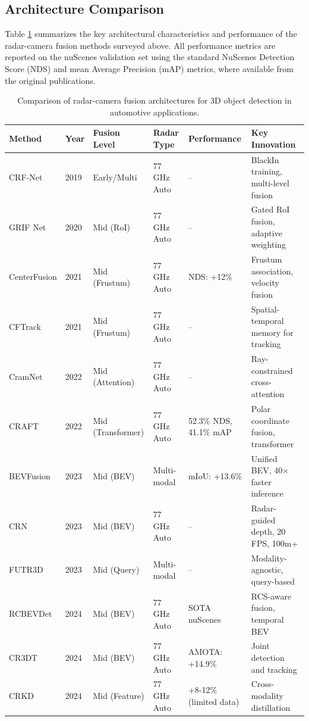 

\subsection{Architecture Comparison}

Table \ref{tab:fusion_architectures} summarizes the key architectural characteristics and performance of the radar-camera fusion methods surveyed above. All performance metrics are reported on the nuScenes validation set using the standard NuScenes Detection Score (NDS) and mean Average Precision (mAP) metrics, where available from the original publications.

\begin{table}[htbp]
\centering
\caption{Comparison of radar-camera fusion architectures for 3D object detection in automotive applications.}
\label{tab:fusion_architectures}
\small
\begin{tabularx}{\textwidth}{@{}lllllX@{}}
\toprule
\textbf{Method} & \textbf{Year} & \textbf{Fusion Level} & \textbf{Radar Type} & \textbf{Performance} & \textbf{Key Innovation} \\
\midrule
CRF-Net \cite{Nobis2019CRFNet} & 2019 & Early/Multi & 77 GHz Auto & -- & BlackIn training, multi-level fusion \\
GRIF Net \cite{Kim2020GRIFNet} & 2020 & Mid (RoI) & 77 GHz Auto & -- & Gated RoI fusion, adaptive weighting \\
CenterFusion \cite{Nabati2021CenterFusion} & 2021 & Mid (Frustum) & 77 GHz Auto & NDS: +12\% & Frustum association, velocity fusion \\
CFTrack \cite{Nabati2021CFTrack} & 2021 & Mid (Frustum) & 77 GHz Auto & -- & Spatial-temporal memory for tracking \\
CramNet \cite{Hwang2022CramNet} & 2022 & Mid (Attention) & 77 GHz Auto & -- & Ray-constrained cross-attention \\
CRAFT \cite{Kim2022CRAFT} & 2022 & Mid (Transformer) & 77 GHz Auto & 52.3\% NDS, 41.1\% mAP & Polar coordinate fusion, transformer \\
BEVFusion \cite{liu2023bevfusion} & 2023 & Mid (BEV) & Multi-modal & mIoU: +13.6\% & Unified BEV, 40$\times$ faster inference \\
CRN \cite{Kim2023CRN} & 2023 & Mid (BEV) & 77 GHz Auto & -- & Radar-guided depth, 20 FPS, 100m+ \\
FUTR3D \cite{Chen2023FUTR3D} & 2023 & Mid (Query) & Multi-modal & -- & Modality-agnostic, query-based \\
RCBEVDet \cite{Lin2024RCBEVDet} & 2024 & Mid (BEV) & 77 GHz Auto & SOTA nuScenes & RCS-aware fusion, temporal BEV \\
CR3DT \cite{Broedermann2024CR3DT} & 2024 & Mid (BEV) & 77 GHz Auto & AMOTA: +14.9\% & Joint detection and tracking \\
CRKD \cite{Zhao2024CRKD} & 2024 & Mid (Feature) & 77 GHz Auto & +8-12\% (limited data) & Cross-modality distillation \\
\bottomrule
\end{tabularx}
\end{table}

